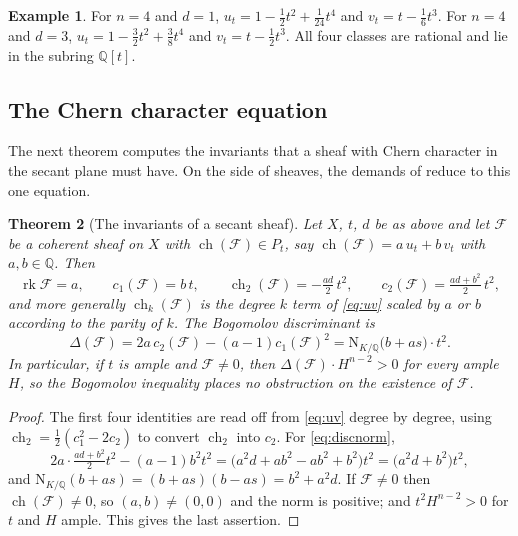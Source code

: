 \documentclass[11pt,reqno]{amsart}
\theoremstyle{plain}
\newtheorem{theorem}{Theorem}[section]
\theoremstyle{definition}
\newtheorem{example}[theorem]{Example}
\theoremstyle{remark}
\newcommand{\QQ}{\mathbb{Q}}
\newcommand{\cF}{\mathcal{F}}
\newcommand{\Nm}{\mathrm{N}}             %
\DeclareMathOperator{\ch}{ch}
\DeclareMathOperator{\rk}{rk}
\begin{document}
\begin{example}\label{ex:planes}
For $n=4$ and $d=1$,
$u_{t}=1-\tfrac{1}{2}t^{2}+\tfrac{1}{24}t^{4}$ and
$v_{t}=t-\tfrac{1}{6}t^{3}$. For $n=4$ and $d=3$,
$u_{t}=1-\tfrac{3}{2}t^{2}+\tfrac{3}{8}t^{4}$ and
$v_{t}=t-\tfrac{1}{2}t^{3}$. All four classes are rational and lie in the
subring $\QQ[t]$.
\end{example}

\subsection{The Chern character equation}

The next theorem computes the invariants that a sheaf with Chern character in
the secant plane must have. On the side of sheaves, the demands of
 reduce to this one equation.

\begin{theorem}[The invariants of a secant sheaf]\label{thm:secantinvariants}
Let $X$, $t$, $d$ be as above and let $\cF$ be a coherent sheaf on $X$ with
$\ch(\cF)\in P_{t}$, say $\ch(\cF)=a\,u_{t}+b\,v_{t}$ with $a,b\in\QQ$. Then
\[
  \rk\cF=a,\qquad
  c_{1}(\cF)=b\,t,\qquad
  \ch_{2}(\cF)=-\tfrac{ad}{2}\,t^{2},\qquad
  c_{2}(\cF)=\tfrac{ad+b^{2}}{2}\,t^{2},
\]
and more generally $\ch_{k}(\cF)$ is the degree $k$ term of \eqref{eq:uv}
scaled by $a$ or $b$ according to the parity of $k$. The Bogomolov
discriminant is
\begin{equation}\label{eq:discnorm}
  \Delta(\cF)=2a\,c_{2}(\cF)-(a-1)c_{1}(\cF)^{2}
  =\Nm_{K/\QQ}\bigl(b+a s\bigr)\cdot t^{2}.
\end{equation}
In particular, if $t$ is ample and $\cF\ne0$, then
$\Delta(\cF)\cdot H^{n-2}>0$ for every ample $H$, so the Bogomolov inequality
places no obstruction on the existence of $\cF$.
\end{theorem}

\begin{proof}
The first four identities are read off from \eqref{eq:uv} degree by degree,
using $\ch_{2}=\tfrac12(c_{1}^{2}-2c_{2})$ to convert $\ch_{2}$ into $c_{2}$.
For \eqref{eq:discnorm},
\[
  2a\cdot\tfrac{ad+b^{2}}{2}t^{2}-(a-1)b^{2}t^{2}
  =\bigl(a^{2}d+ab^{2}-ab^{2}+b^{2}\bigr)t^{2}
  =\bigl(a^{2}d+b^{2}\bigr)t^{2},
\]
and $\Nm_{K/\QQ}(b+as)=(b+as)(b-as)=b^{2}+a^{2}d$. If $\cF\ne0$ then
$\ch(\cF)\ne0$, so $(a,b)\ne(0,0)$ and the norm is positive; and
$t^{2}H^{n-2}>0$ for $t$ and $H$ ample. This gives the last assertion.
\end{proof}
\end{document}
